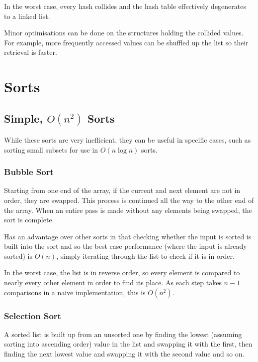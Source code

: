 \documentclass[]{article}
\begin{document}
In the worst case, every hash collides and the hash table effectively degenerates to a linked list.

Minor optimisations can be done on the structures holding the collided values. For example, more frequently accessed values can be shuffled up the list so their retrieval is faster.

\pagebreak

\section{Sorts}

\subsection{Simple, $O(n^2)$ Sorts}

While these sorts are very inefficient, they can be useful in specific cases, such as sorting small subsets for use in $O(n\log{n})$ sorts.

\subsubsection{Bubble Sort}

Starting from one end of the array, if the current and next element are not in order, they are swapped. This process is continued all the way to the other end of the array. When an entire pass is made without any elements being swapped, the sort is complete.

Has an advantage over other sorts in that checking whether the input is sorted is built into the sort and so the best case performance (where the input is already sorted) is $O(n)$, simply iterating through the list to check if it is in order.

In the worst case, the list is in reverse order, so every element is compared to nearly every other element in order to find its place. As each step takes $n - 1$ comparisons in a naive implementation, this is $O(n^2)$.

\subsubsection{Selection Sort}

A sorted list is built up from an unsorted one by finding the lowest (assuming sorting into ascending order) value in the list and swapping it with the first, then finding the next lowest value and swapping it with the second value and so on.
\end{document}
